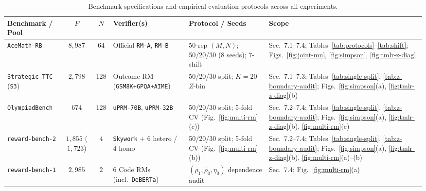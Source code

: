 \documentclass[10pt]{article}
\theoremstyle{plain}
\theoremstyle{definition}
\theoremstyle{remark}
\begin{document}
\begin{table}[htbp]
\centering
\caption{Benchmark specifications and empirical evaluation protocols across all experiments.}
\label{tab:index}
\scriptsize
\setlength{\tabcolsep}{3pt}
\begin{tabular}{@{}lcclll@{}}
\toprule
Benchmark / Pool & $P$ & $N$ & Verifier(s) & Protocol / Seeds & Scope \\
\midrule
\texttt{AceMath-RB} & $8{,}987$ & $64$ & Official \texttt{RM-A}, \texttt{RM-B} & \parbox[t]{3.4cm}{\raggedright 50-rep $(M,N)$; 50/20/30 (8 seeds); 7-shift} & \parbox[t]{3.9cm}{\raggedright Sec.~7.1--7.4; Tables~\ref{tab:protocols}--\ref{tab:shift}; Figs.~\ref{fig:joint-mn}, \ref{fig:simpson}, \ref{fig:tmlr-z-diag}} \\
\addlinespace[2pt]
\texttt{Strategic-TTC} (\texttt{S3}) & $2{,}798$ & $128$ & \parbox[t]{3.2cm}{\raggedright Outcome RM (\texttt{GSM8K+GPQA+AIME})} & \parbox[t]{3.4cm}{\raggedright 50/20/30 split; $K=20$ $Z$-bin} & \parbox[t]{3.9cm}{\raggedright Sec.~7.1--7.3; Tables~\ref{tab:single-split}, \ref{tab:z-boundary-audit}; Figs.~\ref{fig:simpson}(a), \ref{fig:tmlr-z-diag}(b)} \\
\addlinespace[2pt]
\texttt{OlympiadBench} & $674$ & $128$ & \texttt{uPRM-70B}, \texttt{uPRM-32B} & \parbox[t]{3.4cm}{\raggedright 50/20/30 split; 5-fold CV (Fig.~\ref{fig:multi-rm}(c))} & \parbox[t]{3.9cm}{\raggedright Sec.~7.2--7.4; Tables~\ref{tab:single-split}, \ref{tab:z-boundary-audit}; Figs.~\ref{fig:simpson}(a), \ref{fig:tmlr-z-diag}(b), \ref{fig:multi-rm}(c)} \\
\addlinespace[2pt]
\texttt{reward-bench-2} & $1{,}855$ ($1{,}723$) & $4$ & \parbox[t]{3.2cm}{\raggedright \texttt{Skywork} + 6 hetero / 4 homo} & \parbox[t]{3.4cm}{\raggedright 50/20/30 split; 5-fold CV (Fig.~\ref{fig:multi-rm}(b))} & \parbox[t]{3.9cm}{\raggedright Sec.~7.2--7.4; Tables~\ref{tab:single-split}, \ref{tab:z-boundary-audit}; Figs.~\ref{fig:simpson}(a), \ref{fig:tmlr-z-diag}(b), \ref{fig:multi-rm}(a)--(b)} \\
\addlinespace[2pt]
\texttt{reward-bench-1} & $2{,}985$ & $2$ & \parbox[t]{3.2cm}{\raggedright 6 Code RMs (incl.\ \texttt{DeBERTa})} & $(\bar{\rho}_1, \bar{\rho}_0, \eta_0)$ dependence audit & Sec.~7.4; Fig.~\ref{fig:multi-rm}(a) \\
\bottomrule
\end{tabular}
\end{table}

\ifdefined\USEPREPRINT
\end{document}
